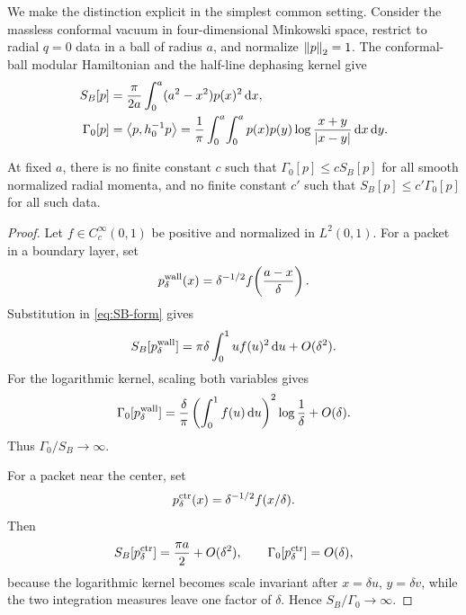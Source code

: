 We make the distinction explicit in the simplest common setting.  Consider
the massless conformal vacuum in four-dimensional Minkowski space, restrict to
radial $q=0$ data in a ball of radius $a$, and normalize $\left\lVert p\right\rVert_2=1$.  The
conformal-ball modular Hamiltonian and the half-line dephasing kernel give
\begin{align}
 S_B[p]
 &=\frac{\pi}{2a}\int_0^a(a^2-x^2)p(x)^2\,\mathrm d x,
 \label{eq:SB-form}\\
 \Gamma_0[p]
 &=\left\langle p,h_0^{-1}p\right\rangle
 =\frac1\pi\int_0^a\!\int_0^a p(x)p(y)
 \log\frac{x+y}{\left\lvert x-y\right\rvert}\,\mathrm d x\,\mathrm d y.
 \label{eq:Gamma0-form}
\end{align}

\begin{proposition}
\label{prop:bekenstein-separation}
At fixed $a$, there is no finite constant $c$ such that
$\Gamma_0[p]\leq cS_B[p]$ for all smooth normalized radial momenta, and no
finite constant $c'$ such that $S_B[p]\leq c'\Gamma_0[p]$ for all such data.
\end{proposition}

\begin{proof}
Let $f\in C_c^\infty(0,1)$ be positive and normalized in $L^2(0,1)$.  For a
packet in a boundary layer, set
\begin{equation}
 p_\delta^{\rm wall}(x)
 =\delta^{-1/2}f\!\left(\frac{a-x}{\delta}\right).
\end{equation}
Substitution in \cref{eq:SB-form} gives
\begin{equation}
 S_B[p_\delta^{\rm wall}]
 =\pi\delta\int_0^1u f(u)^2\,\mathrm d u+O(\delta^2).
 \label{eq:SB-wall}
\end{equation}
For the logarithmic kernel, scaling both variables gives
\begin{equation}
 \Gamma_0[p_\delta^{\rm wall}]
 =\frac{\delta}{\pi}\left(\int_0^1f(u)\,\mathrm d u\right)^2
 \log\frac1\delta+O(\delta).
 \label{eq:Gamma-wall}
\end{equation}
Thus $\Gamma_0/S_B\to\infty$.

For a packet near the center, set
\begin{equation}
 p_\delta^{\rm ctr}(x)=\delta^{-1/2}f(x/\delta).
\end{equation}
Then
\begin{equation}
 S_B[p_\delta^{\rm ctr}]=\frac{\pi a}{2}+O(\delta^2),
 \qquad
 \Gamma_0[p_\delta^{\rm ctr}]=O(\delta),
 \label{eq:center-asymptotics}
\end{equation}
because the logarithmic kernel becomes scale invariant after
$x=\delta u$, $y=\delta v$, while the two integration measures leave one
factor of $\delta$.  Hence $S_B/\Gamma_0\to\infty$.
\end{proof}

